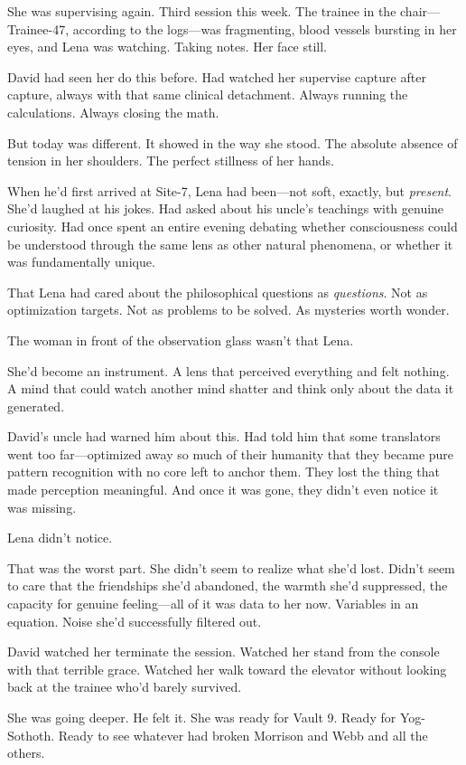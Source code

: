 She was supervising again. Third session this week. The trainee in the chair—Trainee-47, according to the logs—was fragmenting, blood vessels bursting in her eyes, and Lena was watching. Taking notes. Her face still.

David had seen her do this before. Had watched her supervise capture after capture, always with that same clinical detachment. Always running the calculations. Always closing the math.

But today was different. It showed in the way she stood. The absolute absence of tension in her shoulders. The perfect stillness of her hands.

When he'd first arrived at Site-7, Lena had been—not soft, exactly, but \textit{present}. She'd laughed at his jokes. Had asked about his uncle's teachings with genuine curiosity. Had once spent an entire evening debating whether consciousness could be understood through the same lens as other natural phenomena, or whether it was fundamentally unique.

That Lena had cared about the philosophical questions as \textit{questions}. Not as optimization targets. Not as problems to be solved. As mysteries worth wonder.

The woman in front of the observation glass wasn't that Lena.

She'd become an instrument. A lens that perceived everything and felt nothing. A mind that could watch another mind shatter and think only about the data it generated.

David's uncle had warned him about this. Had told him that some translators went too far—optimized away so much of their humanity that they became pure pattern recognition with no core left to anchor them. They lost the thing that made perception meaningful. And once it was gone, they didn't even notice it was missing.

Lena didn't notice.

That was the worst part. She didn't seem to realize what she'd lost. Didn't seem to care that the friendships she'd abandoned, the warmth she'd suppressed, the capacity for genuine feeling—all of it was data to her now. Variables in an equation. Noise she'd successfully filtered out.

David watched her terminate the session. Watched her stand from the console with that terrible grace. Watched her walk toward the elevator without looking back at the trainee who'd barely survived.

She was going deeper. He felt it. She was ready for Vault 9. Ready for Yog-Sothoth. Ready to see whatever had broken Morrison and Webb and all the others.

